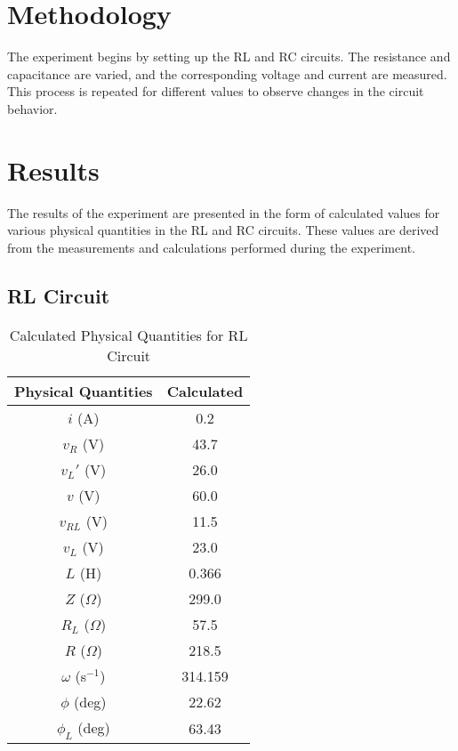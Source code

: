 \documentclass[journal]{IEEEtran}
\begin{document}
\section{Methodology}
The experiment begins by setting up the RL and RC circuits. The resistance and capacitance are varied, and the corresponding voltage and current are measured. This process is repeated for different values to observe changes in the circuit behavior.

\section{Results}

The results of the experiment are presented in the form of calculated values for various physical quantities in the RL and RC circuits. These values are derived from the measurements and calculations performed during the experiment.

\subsection{RL Circuit}
\begin{table}[H]
    \centering
    \caption{Calculated Physical Quantities for RL Circuit}
    \label{tab:rl_results}
    \begin{tabular}{cc}
        \toprule
        \textbf{Physical Quantities} & \textbf{Calculated} \\
        \midrule
        \(i\) (A) & 0.2 \\
        \(v_R\) (V) & 43.7 \\
        \(v_L'\) (V) & 26.0 \\
        \(v\) (V) & 60.0 \\
        \(v_{RL}\) (V) & 11.5 \\
        \(v_L\) (V) & 23.0 \\
        \(L\) (H) & 0.366 \\
        \(Z\) ($\Omega$) & 299.0 \\
        \(R_L\) ($\Omega$) & 57.5 \\
        \(R\) ($\Omega$) & 218.5 \\
        $\omega$ (s$^{-1}$) & 314.159 \\
        \(\phi\) (deg) & 22.62 \\
        \(\phi_L\) (deg) & 63.43 \\
        \bottomrule
    \end{tabular}
\end{table}
\end{document}
